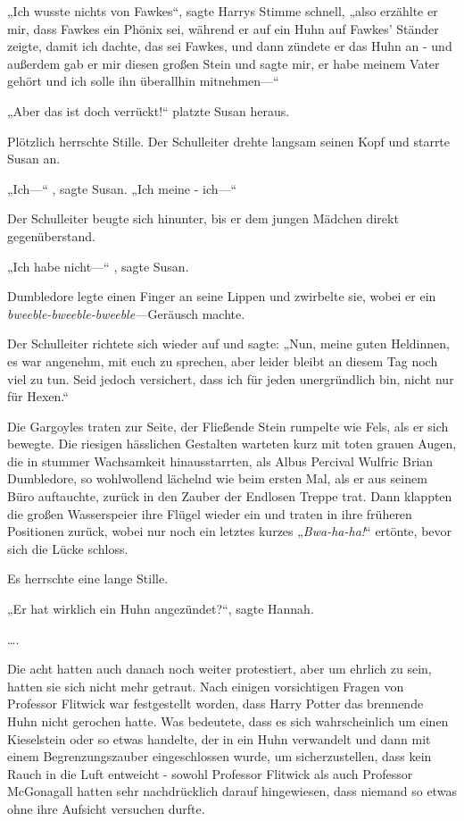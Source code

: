 {„Ich wusste nichts von Fawkes“, sagte Harrys Stimme schnell, „also erzählte er mir, dass Fawkes ein Phönix sei, während er auf ein Huhn auf Fawkes' Ständer zeigte, damit ich dachte, das sei Fawkes, und dann zündete er das Huhn an - und außerdem gab er mir diesen großen Stein und sagte mir, er habe meinem Vater gehört und ich solle ihn überallhin mitnehmen—“

„Aber das ist doch verrückt!“ platzte Susan heraus.

Plötzlich herrschte Stille. Der Schulleiter drehte langsam seinen Kopf und starrte Susan an.

„Ich—“ , sagte Susan. „Ich meine - ich—“

Der Schulleiter beugte sich hinunter, bis er dem jungen Mädchen direkt gegenüberstand.

„Ich habe nicht—“ , sagte Susan.

Dumbledore legte einen Finger an seine Lippen und zwirbelte sie, wobei er ein \emph{bweeble-bweeble-bweeble—}Geräusch machte.

Der Schulleiter richtete sich wieder auf und sagte: „Nun, meine guten Heldinnen, es war angenehm, mit euch zu sprechen, aber leider bleibt an diesem Tag noch viel zu tun. Seid jedoch versichert, dass ich für jeden unergründlich bin, nicht nur für Hexen.“

Die Gargoyles traten zur Seite, der Fließende Stein rumpelte wie Fels, als er sich bewegte. Die riesigen hässlichen Gestalten warteten kurz mit toten grauen Augen, die in stummer Wachsamkeit hinausstarrten, als Albus Percival Wulfric Brian Dumbledore, so wohlwollend lächelnd wie beim ersten Mal, als er aus seinem Büro auftauchte, zurück in den Zauber der Endlosen Treppe trat. Dann klappten die großen Wasserspeier ihre Flügel wieder ein und traten in ihre früheren Positionen zurück, wobei nur noch ein letztes kurzes „\emph{Bwa-ha-ha!}“ ertönte, bevor sich die Lücke schloss.

Es herrschte eine lange Stille.

„Er hat wirklich ein Huhn angezündet?“, sagte Hannah.

….

Die acht hatten auch danach noch weiter protestiert, aber um ehrlich zu sein, hatten sie sich nicht mehr getraut. Nach einigen vorsichtigen Fragen von Professor Flitwick war festgestellt worden, dass Harry Potter das brennende Huhn nicht gerochen hatte. Was bedeutete, dass es sich wahrscheinlich um einen Kieselstein oder so etwas handelte, der in ein Huhn verwandelt und dann mit einem Begrenzungszauber eingeschlossen wurde, um sicherzustellen, dass kein Rauch in die Luft entweicht - sowohl Professor Flitwick als auch Professor McGonagall hatten sehr nachdrücklich darauf hingewiesen, dass niemand so etwas ohne ihre Aufsicht versuchen durfte.

}
